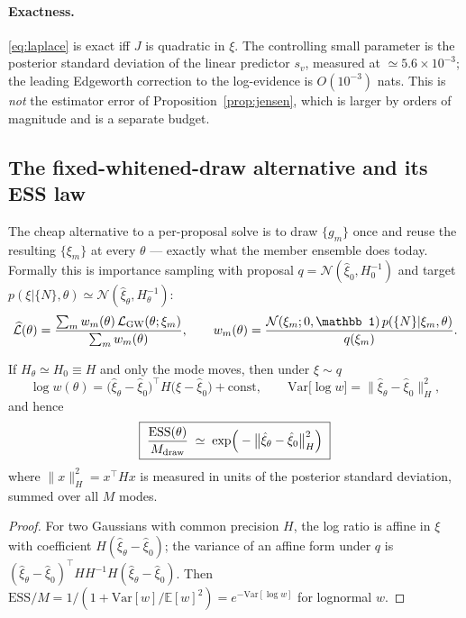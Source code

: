 \paragraph{Exactness.}  \eqref{eq:laplace} is exact iff $J$ is quadratic in
$\xi$.  The controlling small parameter is the posterior standard deviation of
the linear predictor $s_v$, measured at $\simeq5.6\times10^{-3}$; the leading
Edgeworth correction to the log-evidence is $O(10^{-3})$ nats.  This is
\emph{not} the estimator error of Proposition~\ref{prop:jensen}, which is
larger by orders of magnitude and is a separate budget.

\subsection{The fixed-whitened-draw alternative and its ESS law}
\label{sec:ess}

The cheap alternative to a per-proposal solve is to draw $\{g_m\}$ once and
reuse the resulting $\{\xi_m\}$ at every $\theta$ --- exactly what the member
ensemble does today.  Formally this is importance sampling with proposal
$q=\mathcal N(\hat\xi_0,H_0^{-1})$ and target
$p(\xi|\{N\},\theta)\simeq\mathcal N(\hat\xi_\theta,H_\theta^{-1})$:
\begin{equation}
  \widehat{\mathcal L}(\theta)=\frac{\sum_m w_m(\theta)\,
  \mathcal L_{\rm GW}(\theta;\xi_m)}{\sum_m w_m(\theta)},
  \qquad
  w_m(\theta)=\frac{\mathcal N(\xi_m;0,\mathbb 1)\,p(\{N\}|\xi_m,\theta)}{q(\xi_m)} .
  \label{eq:isest}
\end{equation}

\begin{proposition}
\label{prop:esslaw}
If $H_\theta\simeq H_0\equiv H$ and only the mode moves, then under $\xi\sim q$
\begin{equation}
  \log w(\theta)=\big(\hat\xi_\theta-\hat\xi_0\big)^{\!\top}H\big(\xi-\hat\xi_0\big)+\mathrm{const},
  \qquad
  \mathrm{Var}\big[\log w\big]
  =\big\|\hat\xi_\theta-\hat\xi_0\big\|_{H}^{2},
\end{equation}
and hence
\begin{equation}
  \boxed{\;\frac{\mathrm{ESS}(\theta)}{M_{\rm draw}}\;\simeq\;
  \exp\!\Big(-\big\|\hat\xi_\theta-\hat\xi_0\big\|_{H}^{2}\Big)\;}
  \label{eq:esslaw}
\end{equation}
where $\|x\|_H^2=x^{\!\top}Hx$ is measured in units of the posterior standard
deviation, summed over all $M$ modes.
\end{proposition}
\begin{proof}
For two Gaussians with common precision $H$, the log ratio is affine in $\xi$
with coefficient $H(\hat\xi_\theta-\hat\xi_0)$; the variance of an affine form
under $q$ is $(\hat\xi_\theta-\hat\xi_0)^{\!\top}H H^{-1}H(\hat\xi_\theta-\hat\xi_0)$.
Then $\mathrm{ESS}/M=1/(1+\mathrm{Var}[w]/\mathbb E[w]^2)=e^{-\mathrm{Var}[\log w]}$
for lognormal $w$.
\end{proof}

